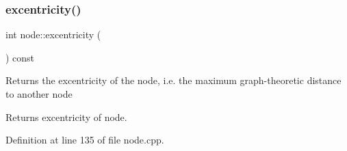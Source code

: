 \subsubsection{\texorpdfstring{excentricity()}{excentricity()}}
{\footnotesize\ttfamily int node\+::excentricity (\begin{DoxyParamCaption}{ }\end{DoxyParamCaption}) const}

Returns the excentricity of the node, i.\+e. the maximum graph-\/theoretic distance to another node

\begin{DoxyReturn}{Returns}
excentricity of node. 
\end{DoxyReturn}


Definition at line 135 of file node.\+cpp.


